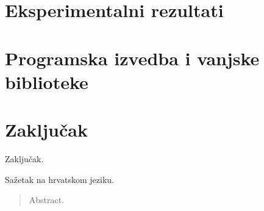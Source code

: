 \documentclass[times, utf8, zavrsni]{fer}
\begin{document}
\chapter{Eksperimentalni rezultati}
\chapter{Programska izvedba i vanjske biblioteke}

\chapter{Zaključak}
Zaključak.




\begin{sazetak}
Sažetak na hrvatskom jeziku.

\end{sazetak}

\begin{abstract}
Abstract.

\end{abstract}
\end{document}
